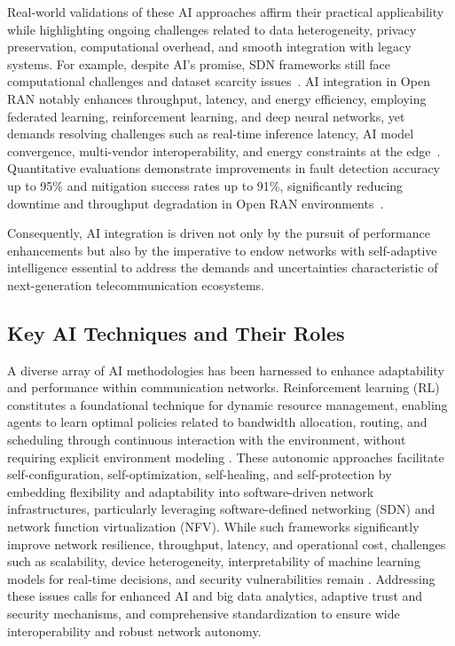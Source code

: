 \documentclass[sigconf]{acmart}
\begin{document}
Real-world validations of these AI approaches affirm their practical applicability while highlighting ongoing challenges related to data heterogeneity, privacy preservation, computational overhead, and smooth integration with legacy systems. For example, despite AI's promise, SDN frameworks still face computational challenges and dataset scarcity issues~\cite{ref52}. AI integration in Open RAN notably enhances throughput, latency, and energy efficiency, employing federated learning, reinforcement learning, and deep neural networks, yet demands resolving challenges such as real-time inference latency, AI model convergence, multi-vendor interoperability, and energy constraints at the edge~\cite{ref54,ref55}. Quantitative evaluations demonstrate improvements in fault detection accuracy up to 95\% and mitigation success rates up to 91\%, significantly reducing downtime and throughput degradation in Open RAN environments~\cite{ref55}. 

Consequently, AI integration is driven not only by the pursuit of performance enhancements but also by the imperative to endow networks with self-adaptive intelligence essential to address the demands and uncertainties characteristic of next-generation telecommunication ecosystems.

\subsection{Key AI Techniques and Their Roles}

A diverse array of AI methodologies has been harnessed to enhance adaptability and performance within communication networks. Reinforcement learning (RL) constitutes a foundational technique for dynamic resource management, enabling agents to learn optimal policies related to bandwidth allocation, routing, and scheduling through continuous interaction with the environment, without requiring explicit environment modeling \cite{ref11,ref12}. These autonomic approaches facilitate self-configuration, self-optimization, self-healing, and self-protection by embedding flexibility and adaptability into software-driven network infrastructures, particularly leveraging software-defined networking (SDN) and network function virtualization (NFV). While such frameworks significantly improve network resilience, throughput, latency, and operational cost, challenges such as scalability, device heterogeneity, interpretability of machine learning models for real-time decisions, and security vulnerabilities remain \cite{ref11}. Addressing these issues calls for enhanced AI and big data analytics, adaptive trust and security mechanisms, and comprehensive standardization to ensure wide interoperability and robust network autonomy.
\end{document}
